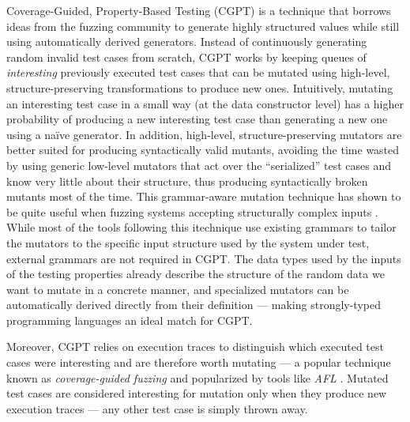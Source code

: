 \documentclass[sigconf, anonymous, review]{acmart}
\newcommand{\quickcheck}{\textit{QuickCheck}\xspace}
\newcommand{\quickchick}{\textit{QuickChick}\xspace}
\newcommand{\fuzzchick}{\textit{FuzzChick}\xspace}
\begin{document}
%
Coverage-Guided, Property-Based Testing (CGPT) \cite{lampropoulos2019coverage}
is a technique that borrows ideas from the fuzzing community to generate highly
structured values while still using automatically derived generators.
%
%
Instead of continuously generating random invalid test cases from scratch, CGPT
works by keeping queues of \emph{interesting} previously executed test cases
that can be mutated using high-level, structure-preserving transformations to
produce new ones.
%
%
Intuitively, mutating an interesting test case in a small way (at the data
constructor level) has a higher probability of producing a new interesting test
case than generating a new one using a na\"ive generator.
%
In addition, high-level, structure-preserving mutators are better suited for
producing syntactically valid mutants, avoiding the time wasted by using generic
low-level mutators that act over the ``serialized'' test cases and know very
little about their structure, thus producing syntactically broken mutants most
of the time.
%
This grammar-aware mutation technique has shown to be quite useful when fuzzing
systems accepting structurally complex inputs \cite{holler2012fuzzing,
  wang2019superion, xsmith}.
%
While most of the tools following this itechnique use existing grammars to
tailor the mutators to the specific input structure used by the system under
test, external grammars are not required in CGPT.
%
%
%
The data types used by the inputs of the testing properties already describe the
structure of the random data we want to mutate in a concrete manner, and
specialized mutators can be automatically derived directly from their definition
--- making strongly-typed programming languages an ideal match for CGPT.

%
Moreover, CGPT relies on execution traces to distinguish which executed test
cases were interesting and are therefore worth mutating --- a popular technique
known as \emph{coverage-guided fuzzing} and popularized by tools like \emph{AFL}
\cite{afl}.
%
Mutated test cases are considered interesting for mutation only when they
produce new execution traces --- any other test case is simply thrown away.
\end{document}

